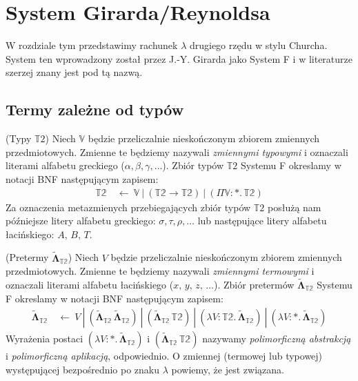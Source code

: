 \section{System Girarda/Reynoldsa}\label{sec:system_f}
W rozdziale tym przedstawimy rachunek \(\lambda\) drugiego rzędu w stylu Churcha. System ten wprowadzony został przez J.-Y.  Girarda jako System F i w literaturze szerzej znany jest pod tą nazwą. 

\subsection{Termy zależne od typów}

\begin{definicja}(Typy \(\mathbb{T}2\))
  Niech \(\mathbb{V}\) będzie przeliczalnie nieskończonym zbiorem zmiennych przedmiotowych. Zmienne te będziemy nazywali \emph{zmiennymi typowymi} i oznaczali literami alfabetu greckiego (\(\alpha, \beta, \gamma, \dots\)). Zbiór typów \(\mathbb{T}2\) Systemu F okreslamy w notacji BNF następującym zapisem:
  \begin{align*}
    \mathbb{T2}\ &\leftarrow\ \mathbb{V}\ |\ (\mathbb{T2}\to\mathbb{T2})\ |\ (\Pi \mathbb{V}:*.\,\mathbb{T2})
  \end{align*}
Za oznaczenia metazmienych przebiegających zbiór typów \(\mathbb{T}2\) posłużą nam późniejsze litery alfabetu greckiego: \(\sigma,\tau,\rho,\dots\) lub następujące litery alfabetu łacińskiego: \(A,\, B,\, T\).
\end{definicja}
\begin{definicja}(Pretermy \(\mathbf{\tilde\Lambda}_\mathbb{T2}\))
  Niech \(V\) będzie przeliczalnie nieskończonym zbiorem zmiennych przedmiotowych. Zmienne te będziemy nazywali \emph{zmiennymi termowymi} i oznaczali literami alfabetu łacińskiego (\(x,\, y,\, z,\,\dots\)). Zbiór pretermów \(\mathbf{\tilde\Lambda}_\mathbb{T2}\) Systemu F okreslamy w notacji BNF następującym zapisem:
  \begin{align*}
      \mathbf{\tilde\Lambda}_\mathbb{T2}\ &\leftarrow \ V\ |\ (\mathbf{\tilde\Lambda}_\mathbb{T2}\,\mathbf{\tilde\Lambda}_\mathbb{T2}) \ |\ (\mathbf{\tilde\Lambda}_\mathbb{T2}\,\mathbb{T2}) \ |\ (\lambda V:\mathbb{T2}.\, \mathbf{\tilde\Lambda}_\mathbb{T2})\ |\ (\lambda V:*.\, \mathbf{\tilde\Lambda}_\mathbb{T2})
  \end{align*}
  Wyrażenia postaci \((\lambda V:*.\, \mathbf{\tilde\Lambda}_\mathbb{T2})\) i \((\mathbf{\tilde\Lambda}_\mathbb{T2}\,\mathbb{T2})\) nazywamy \emph{polimorficzną abstrakcją} i \emph{polimorficzną aplikacją}, odpowiednio. O zmiennej (termowej lub typowej) występującej bezpośrednio po znaku \(\lambda\) powiemy, że jest związana.  
\end{definicja}

